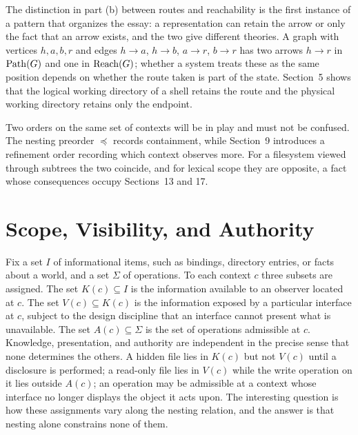 The distinction in part (b) between routes and reachability is the first instance of a pattern that organizes the essay: a representation can retain the arrow or only the fact that an arrow exists, and the two give different theories. A graph with vertices $h,a,b,r$ and edges $h\to a$, $h\to b$, $a\to r$, $b\to r$ has two arrows $h\to r$ in $\operatorname{Path}(G)$ and one in $\operatorname{Reach}(G)$; whether a system treats these as the same position depends on whether the route taken is part of the state. Section~5 shows that the logical working directory of a shell retains the route and the physical working directory retains only the endpoint.

Two orders on the same set of contexts will be in play and must not be confused. The nesting preorder $\preceq$ records containment, while Section~9 introduces a refinement order recording which context observes more. For a filesystem viewed through subtrees the two coincide, and for lexical scope they are opposite, a fact whose consequences occupy Sections~13 and 17.

\section{Scope, Visibility, and Authority}

Fix a set $I$ of informational items, such as bindings, directory entries, or facts about a world, and a set $\Sigma$ of operations. To each context $c$ three subsets are assigned. The set $K(c)\subseteq I$ is the information available to an observer located at $c$. The set $V(c)\subseteq K(c)$ is the information exposed by a particular interface at $c$, subject to the design discipline that an interface cannot present what is unavailable. The set $A(c)\subseteq\Sigma$ is the set of operations admissible at $c$. Knowledge, presentation, and authority are independent in the precise sense that none determines the others. A hidden file lies in $K(c)$ but not $V(c)$ until a disclosure is performed; a read-only file lies in $V(c)$ while the write operation on it lies outside $A(c)$; an operation may be admissible at a context whose interface no longer displays the object it acts upon. The interesting question is how these assignments vary along the nesting relation, and the answer is that nesting alone constrains none of them.

